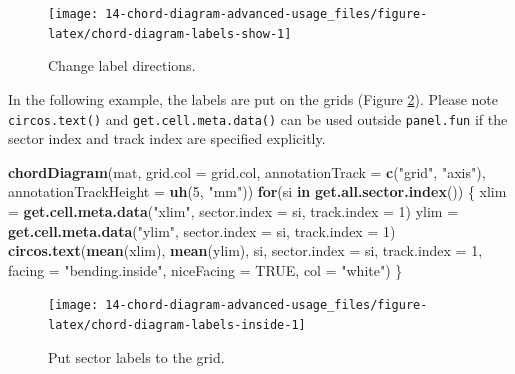 \documentclass[]{book}
\newenvironment{Shaded}{\begin{snugshade}}{\end{snugshade}}
\newcommand{\KeywordTok}[1]{\textcolor[rgb]{0.13,0.29,0.53}{\textbf{#1}}}
\newcommand{\DataTypeTok}[1]{\textcolor[rgb]{0.13,0.29,0.53}{#1}}
\newcommand{\DecValTok}[1]{\textcolor[rgb]{0.00,0.00,0.81}{#1}}
\newcommand{\StringTok}[1]{\textcolor[rgb]{0.31,0.60,0.02}{#1}}
\newcommand{\OtherTok}[1]{\textcolor[rgb]{0.56,0.35,0.01}{#1}}
\newcommand{\ControlFlowTok}[1]{\textcolor[rgb]{0.13,0.29,0.53}{\textbf{#1}}}
\newcommand{\NormalTok}[1]{#1}
\theoremstyle{definition}
\theoremstyle{definition}
\theoremstyle{remark}
\begin{document}
\begin{figure}

{\centering \texttt{[image: 14-chord-diagram-advanced-usage\_files/figure-latex/chord-diagram-labels-show-1]} 

}

\caption{Change label directions.}\label{fig:chord-diagram-labels-show}
\end{figure}

In the following example, the labels are put on the grids (Figure
\ref{fig:chord-diagram-labels-inside}). Please note
\texttt{circos.text()} and \texttt{get.cell.meta.data()} can be used
outside \texttt{panel.fun} if the sector index and track index are
specified explicitly.

\begin{Shaded}
\begin{Highlighting}[]
\KeywordTok{chordDiagram}\NormalTok{(mat, }\DataTypeTok{grid.col =}\NormalTok{ grid.col, }
    \DataTypeTok{annotationTrack =} \KeywordTok{c}\NormalTok{(}\StringTok{"grid"}\NormalTok{, }\StringTok{"axis"}\NormalTok{), }\DataTypeTok{annotationTrackHeight =} \KeywordTok{uh}\NormalTok{(}\DecValTok{5}\NormalTok{, }\StringTok{"mm"}\NormalTok{))}
\ControlFlowTok{for}\NormalTok{(si }\ControlFlowTok{in} \KeywordTok{get.all.sector.index}\NormalTok{()) \{}
\NormalTok{    xlim =}\StringTok{ }\KeywordTok{get.cell.meta.data}\NormalTok{(}\StringTok{"xlim"}\NormalTok{, }\DataTypeTok{sector.index =}\NormalTok{ si, }\DataTypeTok{track.index =} \DecValTok{1}\NormalTok{)}
\NormalTok{    ylim =}\StringTok{ }\KeywordTok{get.cell.meta.data}\NormalTok{(}\StringTok{"ylim"}\NormalTok{, }\DataTypeTok{sector.index =}\NormalTok{ si, }\DataTypeTok{track.index =} \DecValTok{1}\NormalTok{)}
    \KeywordTok{circos.text}\NormalTok{(}\KeywordTok{mean}\NormalTok{(xlim), }\KeywordTok{mean}\NormalTok{(ylim), si, }\DataTypeTok{sector.index =}\NormalTok{ si, }\DataTypeTok{track.index =} \DecValTok{1}\NormalTok{, }
        \DataTypeTok{facing =} \StringTok{"bending.inside"}\NormalTok{, }\DataTypeTok{niceFacing =} \OtherTok{TRUE}\NormalTok{, }\DataTypeTok{col =} \StringTok{"white"}\NormalTok{)}
\NormalTok{\}}
\end{Highlighting}
\end{Shaded}

\begin{figure}

{\centering \texttt{[image: 14-chord-diagram-advanced-usage\_files/figure-latex/chord-diagram-labels-inside-1]} 

}

\caption{Put sector labels to the grid.}\label{fig:chord-diagram-labels-inside}
\end{figure}
\end{document}
